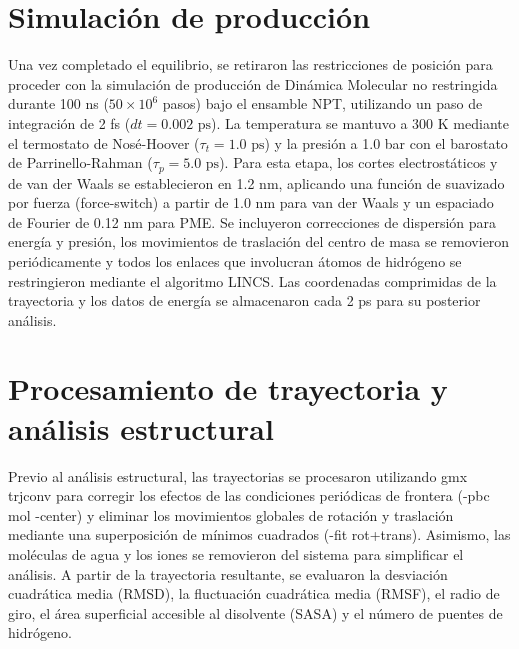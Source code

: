\section{Simulación de producción}

Una vez completado el equilibrio, se retiraron las restricciones de posición para proceder con la simulación de producción de Dinámica Molecular no restringida durante 100 ns ($50 \times 10^6$ pasos) bajo el ensamble NPT, utilizando un paso de integración de 2 fs ($dt = 0.002\text{ ps}$). La temperatura se mantuvo a 300 K mediante el termostato de Nosé-Hoover ($\tau_t = 1.0\text{ ps}$) y la presión a 1.0 bar con el barostato de Parrinello-Rahman ($\tau_p = 5.0\text{ ps}$). Para esta etapa, los cortes electrostáticos y de van der Waals se establecieron en 1.2 nm, aplicando una función de suavizado por fuerza (force-switch) a partir de 1.0 nm para van der Waals y un espaciado de Fourier de 0.12 nm para PME. Se incluyeron correcciones de dispersión para energía y presión, los movimientos de traslación del centro de masa se removieron periódicamente y todos los enlaces que involucran átomos de hidrógeno se restringieron mediante el algoritmo LINCS. Las coordenadas comprimidas de la trayectoria y los datos de energía se almacenaron cada 2 ps para su posterior análisis.

\section{Procesamiento de trayectoria y análisis estructural}

Previo al análisis estructural, las trayectorias se procesaron utilizando gmx trjconv para corregir los efectos de las condiciones periódicas de frontera (-pbc mol -center) y eliminar los movimientos globales de rotación y traslación mediante una superposición de mínimos cuadrados (-fit rot+trans). Asimismo, las moléculas de agua y los iones se removieron del sistema para simplificar el análisis. A partir de la trayectoria resultante, se evaluaron la desviación cuadrática media (RMSD), la fluctuación cuadrática media (RMSF), el radio de giro, el área superficial accesible al disolvente (SASA) y el número de puentes de hidrógeno. 








